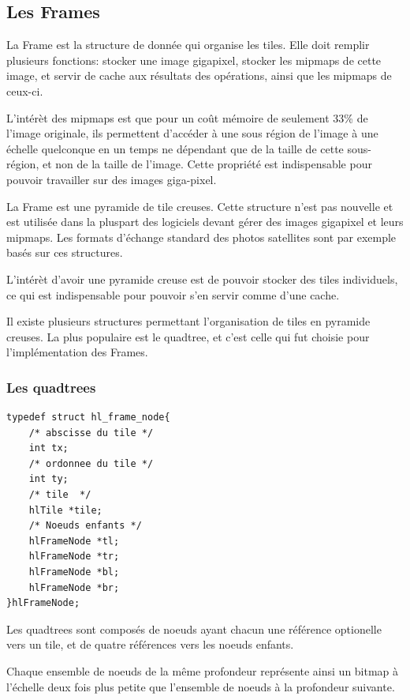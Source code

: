 		\subsection{Les Frames}
			La Frame est la structure de donnée qui organise les tiles. Elle doit remplir plusieurs fonctions: stocker une image gigapixel,
			stocker les mipmaps de cette image, et servir de cache aux résultats des opérations, ainsi que les mipmaps de ceux-ci.

			L'intérèt des mipmaps est que pour un coût mémoire de seulement 33\% de l'image originale, ils permettent d'accéder à une sous région
			de l'image à une échelle quelconque en un temps ne dépendant que de la taille de cette sous-région, et non de la taille de l'image. 
			Cette propriété est indispensable pour pouvoir travailler sur des images giga-pixel.
			
			La Frame est une pyramide de tile creuses. Cette structure n'est pas nouvelle et est utilisée dans la pluspart des logiciels devant
			gérer des images gigapixel et leurs mipmaps. Les formats d'échange standard des photos satellites sont par exemple basés sur ces structures.
			
			L'intérèt d'avoir une pyramide creuse est de pouvoir stocker des tiles individuels, ce qui est indispensable pour pouvoir s'en servir
			comme d'une cache.

			Il existe plusieurs structures permettant l'organisation de tiles en pyramide creuses. La plus populaire est le quadtree, et c'est celle
			qui fut choisie pour l'implémentation des Frames.

			\subsubsection{Les quadtrees}
		\begin{lstlisting}[float,caption={Définition des hlFrameNodes},frame=tb,label=lsthlFrameNode]
typedef struct hl_frame_node{
	/* abscisse du tile */
	int tx;
	/* ordonnee du tile */
	int ty;
	/* tile  */
	hlTile *tile;
	/* Noeuds enfants */
	hlFrameNode *tl;
	hlFrameNode *tr;
	hlFrameNode *bl;
	hlFrameNode *br;
}hlFrameNode;
		\end{lstlisting}
				Les quadtrees sont composés de noeuds ayant chacun une référence optionelle vers un tile, et de quatre références vers
				les noeuds enfants. 

				Chaque ensemble de noeuds de la même profondeur représente ainsi un bitmap à l'échelle deux fois plus petite que l'ensemble de
				noeuds à la profondeur suivante.

